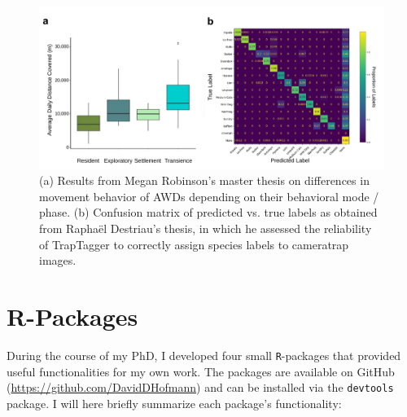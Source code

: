 \documentclass[../FinalThesis.tex]{subfiles}
\begin{document}
\begin{figure}[htpb]
\begin{center}
  \includegraphics[width = \textwidth]{Figures/MasterTheses}
  \caption{(a) Results from Megan Robinson's master thesis on differences in
  movement behavior of AWDs depending on their behavioral mode / phase. (b)
  Confusion matrix of predicted vs. true labels as obtained from Rapha{\"e}l
  Destriau's thesis, in which he assessed the reliability of TrapTagger to
  correctly assign species labels to cameratrap images.}
  \label{MasterTheses}
\end{center}
\end{figure}

\section{R-Packages}

During the course of my PhD, I developed four small \texttt{R}-packages that
provided useful functionalities for my own work. The packages are available on
GitHub (\url{https://github.com/DavidDHofmann}) and can be installed via the
\texttt{devtools} package. I will here briefly summarize each package's
functionality:
\end{document}
